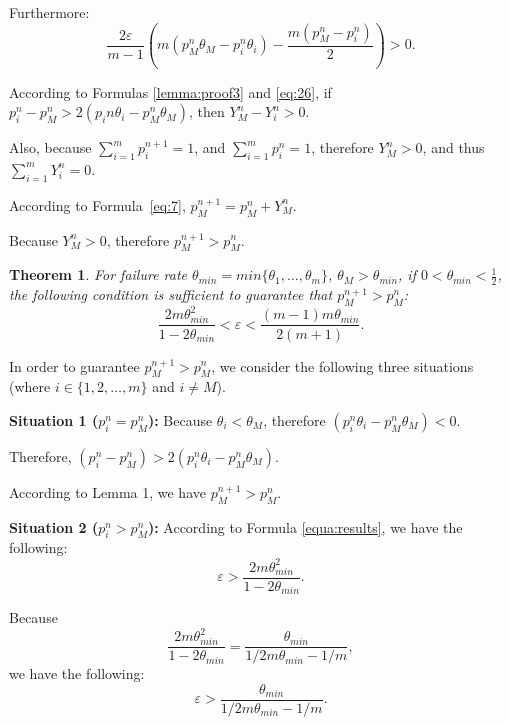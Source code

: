 \documentclass[10pt,journal,cspaper,compsoc,onecolumn]{IEEEtran}
\begin{document}
\begin{spacing}{1.2}
\begin{IEEEproof}
Furthermore:
\begin{equation}
  \label{lemma:proof3}
\displaystyle\frac{2\varepsilon}{m - 1}(m(p_M^{n}\theta_M - p_i^{n}\theta_i) - \displaystyle\frac{m(p_M^n - p_i^n)}{2}) > 0.
\end{equation}

According to Formulas \ref{lemma:proof3} and \ref{eq:26},
if $p_i^{n} - p_M^{n} > 2(p_i{n}\theta_i - p_M^{n}\theta_M)$, then
$Y_M^n - Y_i^n > 0$.

Also, because
$\sum_{i=1}^mp_i^{n + 1} = 1$, and
$\sum_{i=1}^mp_i^{n} = 1$, therefore
$Y_M^n >0$, and thus
$\sum_{i=1}^mY_i^n = 0$.

According to Formula~\ref{eq:7},
$p_M^{n + 1} = p_M^n + Y_M^n$.

Because $Y_M^n >0$, therefore
$p_M^{n + 1} > p_M^n$.
\end{IEEEproof}

\newtheorem{my}{Theorem}
\label{theorem}
\begin{my}
  For failure rate $\theta_{min} = min\{\theta_1, \ldots, \theta_m\}$, $\theta_M > \theta_{min}$, if $0 < \theta_{min} < \frac{1}{2}$, the following condition is sufficient to guarantee that $p_M^{n + 1} > p_M^{n}$:
  \begin{equation}
\label{equa:results}
  \displaystyle\frac{2m\theta_{min}^2}{1-2\theta_{min}} < \varepsilon < \displaystyle\frac{(m-1)m\theta_{min}}{2(m + 1)}.
\end{equation}
\end{my}

\begin{IEEEproof}
  In order to guarantee $p_M^{n + 1} > p_M^{n}$, we consider the following three situations (where $i \in \{1, 2, \ldots, m\}$ and $i \ne M$).

  \textbf{Situation 1 ($p_i^n = p_M^n$):}
Because $\theta_i < \theta_M$, therefore
$(p_i^n\theta_i - p_M^n\theta_M) < 0$.

Therefore, $(p_i^n - p_M^n) > 2(p_i^n\theta_i - p_M^n\theta_M)$.

According to Lemma 1, we have $p_M^{n + 1} > p_M^{n}$.

\textbf{Situation 2 ($p_i^n > p_M^n$):} According to Formula \ref{equa:results}, we have the following:
$$\varepsilon > \displaystyle\frac{2m\theta_{min}^2}{1-2\theta_{min}}.$$

Because
$$\displaystyle\frac{2m\theta_{min}^2}{1-2\theta_{min}} = \displaystyle\frac{\theta_{min}}{1/2m\theta_{min} - 1/m},$$
we have the following:
$$\varepsilon > \displaystyle\frac{\theta_{min}}{1/2m\theta_{min} - 1/m}.$$


\end{IEEEproof}
\end{spacing}
\end{document}
